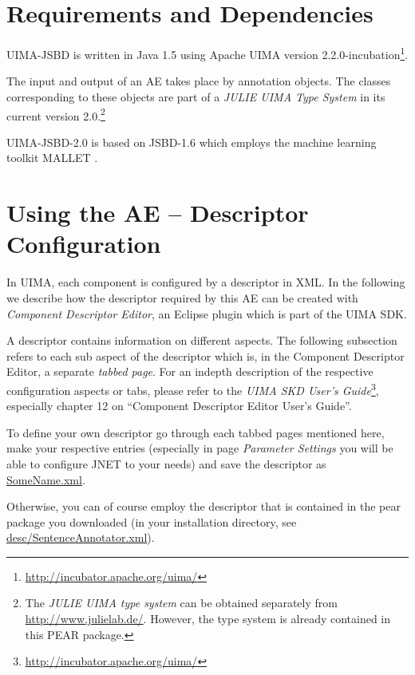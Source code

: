 \documentclass[11pt,a4paper,halfparskip]{scrartcl}
\begin{document}
\section{Requirements and Dependencies}

UIMA-JSBD is written in Java 1.5 using Apache UIMA version
2.2.0-incubation\footnote{\url{http://incubator.apache.org/uima/}}.

The input and output of an AE takes place by annotation objects. The
classes corresponding to these objects are part of a \emph{JULIE UIMA
  Type System} in its current version 2.0.\footnote{The \emph{JULIE UIMA type system} can be
  obtained separately from \url{http://www.julielab.de/}. However, the type system is already contained in this PEAR package.}

UIMA-JSBD-2.0 is based on JSBD-1.6 which employs the machine learning
toolkit MALLET \cite{McCallum2002}.




\section{Using the AE -- Descriptor Configuration}

In UIMA, each component is configured by a descriptor in XML. In the
following we describe how the descriptor required by this AE can be
created with \emph{Component Descriptor Editor}, an Eclipse plugin
which is part of the UIMA SDK.

A descriptor contains information on different aspects. The following
subsection refers to each sub aspect of the descriptor which is, in
the Component Descriptor Editor, a separate \emph{tabbed page}. For an
indepth description of the respective configuration aspects or tabs,
please refer to the \emph{UIMA SKD User's
  Guide}\footnote{\url{http://incubator.apache.org/uima/}}, especially
chapter 12 on ``Component Descriptor Editor User's Guide''.

To define your own descriptor go through each tabbed pages mentioned
here, make your respective entries (especially in page \emph{Parameter
  Settings} you will be able to configure JNET to your needs) and save
the descriptor as \url{SomeName.xml}.

Otherwise, you can of course employ the descriptor that is contained
in the pear package you downloaded (in your installation directory, see
\url{desc/SentenceAnnotator.xml}).
\end{document}
